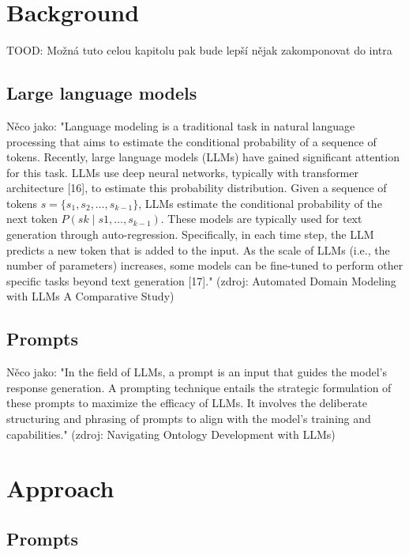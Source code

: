 \chapter{Background}

TOOD: Možná tuto celou kapitolu pak bude lepší nějak zakomponovat do intra

\section{Large language models}

Něco jako: "Language modeling is a traditional task in natural language processing that aims to estimate the conditional probability of a sequence of tokens. Recently, large language models (LLMs) have gained significant attention for this task. LLMs use deep neural networks, typically with transformer architecture [16], to estimate this probability distribution. Given a sequence of tokens $s = \{ s_1, s_2, \ldots, s_{k-1} \}$, LLMs estimate the conditional probability of the next token $P(sk \mid s1,\ldots, s_{k-1})$.
These models are typically used for text generation through auto-regression. Specifically, in each time step, the LLM predicts a new token that is added to the input. As the scale of LLMs (i.e., the number of parameters) increases, some models can be fine-tuned to perform other specific tasks beyond text generation [17]." (zdroj: Automated Domain Modeling with LLMs A Comparative Study) \\


\section{Prompts}
Něco jako: "In the field of LLMs, a prompt is an input that guides the model’s response
 generation. A prompting technique entails the strategic formulation of these
 prompts to maximize the efficacy of LLMs. It involves the deliberate structuring
 and phrasing of prompts to align with the model’s training and capabilities." (zdroj: Navigating Ontology Development with LLMs) \\




\chapter{Approach}


\section{Prompts}


